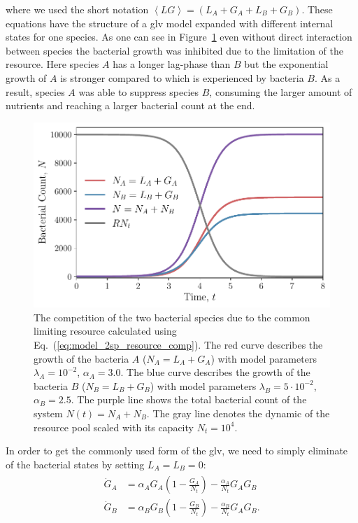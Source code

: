 \documentclass[10pt,twocolumn,5p]{elsarticle}
\numberwithin{equation}{section}
\begin{document}
where we used the short notation $\left<LG\right>=(L_A+G_A+L_B+G_B)$.
These equations have the structure of a \ac{glv} model expanded with different internal states for one species.
As one can see in Figure~\ref{fig:2pool_resource_2sp} even without direct interaction between species the bacterial growth was inhibited due to the limitation of the resource.
Here species $A$ has a longer lag-phase than $B$ but the exponential growth of $A$ is stronger compared to which is experienced by bacteria $B$.
As a result, species $A$ was able to suppress species $B$, consuming the larger amount of nutrients and reaching a larger bacterial count at the end.
\begin{figure}
    \begin{center}
    \includegraphics[width=0.9\columnwidth]{Figures-pool_model_2pools_resource_competition.pdf}
    \caption{
        The competition of the two bacterial species due to the common limiting resource calculated using Eq.~(\ref{eq:model_2sp_resource_comp}).
        The red curve describes the growth of the bacteria $A$ ($N_A = L_A+G_A$) with model parameters $\lambda_A=10^{-2}$, $\alpha_A=3.0$.
        The blue curve describes the growth of the bacteria $B$ ($N_B = L_B+G_B$) with model parameters $\lambda_B=5\cdot 10^{-2}$, $\alpha_B=2.5$.
        The purple line shows the total bacterial count of the system  $N(t)=N_A+N_B$.
        The gray line denotes the dynamic of the resource pool scaled with its capacity $N_t=10^4$.
    }
    \label{fig:2pool_resource_2sp}
    \end{center}
\end{figure}
%
In order to get the commonly used form of the \ac{glv}, we need to simply eliminate of the bacterial states by setting $L_A=L_B=0$:
\begin{align}
    \begin{split}
        \dot{G}_A &= \alpha_A G_A\left(1 - \frac{G_A}{N_t}\right) - \frac{\alpha_A}{N_t}G_AG_B\\
        \dot{G}_B &= \alpha_B G_B\left(1-\frac{G_B}{N_t}\right) -\frac{\alpha_B}{N_t}G_AG_B. 
    \label{eq:LV_simple}
    \end{split}
\end{align}
\end{document}
